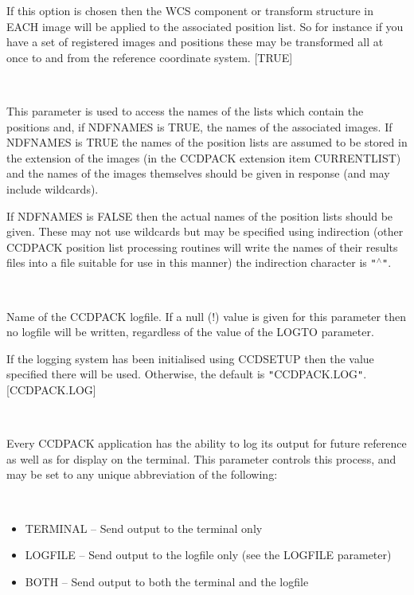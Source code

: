 \documentclass[twoside,11pt]{article}
\newcommand{\htmlref}[2]{#1}
\renewcommand{\_}{\texttt{\symbol{95}}}
\newcommand{\qt}[1]{{\tt "}#1{\tt "}}
\newcommand{\xroutine}[1]{\htmlref{{\sc #1}}{#1}}
\newcommand{\sstsubsection}[1]{ \item[{#1}] \mbox{} \\}
\newcommand{\sstitemlist}[1]{
  \mbox{} \\
  \vspace{-3.5ex}
  \begin{itemize}
     #1
  \end{itemize}
}
\newcommand{\sstitem}{\item}
\newcommand{\sstsubsection}[1]{\item[{#1}]}
\newcommand{\sstitemlist}[1]{
      \begin{itemize}
         #1
      \end{itemize}
      \\
   }
\newcommand{\sstitem}{\item}
\begin{document}
{{{         If this option is chosen then the WCS component or transform
         structure in EACH image will be applied to the associated
         position list. So for instance if you have a set of registered
         images and positions these may be transformed all at once to and
         from the reference coordinate system.
         [TRUE]
      }
      \sstsubsection{
         INLIST = LITERAL (Read)
      }{
         This parameter is used to access the names of the lists which
         contain the positions and, if NDFNAMES is TRUE, the names of
         the associated images. If NDFNAMES is TRUE the names of the
         position lists are assumed to be stored in the extension of
         the images (in the CCDPACK extension item CURRENT\_LIST) and the
         names of the images themselves should be given in response (and
         may include wildcards).

         If NDFNAMES is FALSE then the actual names of the position
         lists should be given. These may not use wildcards but may be
         specified using indirection (other CCDPACK position list
         processing routines will write the names of their results
         files into a file suitable for use in this manner) the
         indirection character is \qt{$^\wedge$}.
      }
      \sstsubsection{
         LOGFILE = FILENAME (Read)
      }{
         Name of the CCDPACK logfile.  If a null (!) value is given for
         this parameter then no logfile will be written, regardless of
         the value of the LOGTO parameter.

         If the logging system has been initialised using \xroutine{CCDSETUP}
         then the value specified there will be used. Otherwise, the
         default is \qt{CCDPACK.LOG}.
         [CCDPACK.LOG]
      }
      \sstsubsection{
         LOGTO = LITERAL (Read)
      }{
         Every CCDPACK application has the ability to log its output
         for future reference as well as for display on the terminal.
         This parameter controls this process, and may be set to any
         unique abbreviation of the following:
         \sstitemlist{

            \sstitem
               TERMINAL  -- Send output to the terminal only

            \sstitem
               LOGFILE   -- Send output to the logfile only (see the
                               LOGFILE parameter)

            \sstitem
               BOTH      -- Send output to both the terminal and the
                               logfile

}}}}
\end{document}
